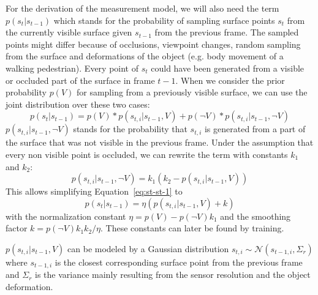 \documentclass[twoside,a4paper,article]{combine}
\begin{document}
For the derivation of the measurement model, we will also need the
term $p(s_t|s_{t-1})$ which stands for the probability of sampling
surface points $s_t$ from the currently visible surface given
$s_{t-1}$ from the previous frame. The sampled points might differ
because of occlusions, viewpoint changes, random sampling from the
surface and deformations of the object (e.g. body movement of a
walking pedestrian). Every point of $s_t$ could have been generated
from a visible or occluded part of the surface in frame $t-1$. When we
consider the prior probability $p(V)$ for sampling from a previously
visible surface, we can use the joint distribution over these two
cases:
\begin{equation}
\label{eq:st-st-1}
p(s_t|s_{t-1})=p(V)*p(s_{t,i}|s_{t-1},V) + p(\neg V)*p(s_{t,i}|s_{t-1},\neg V)
\end{equation}
$p(s_{t,i}|s_{t-1},\neg V)$ stands for the probability that $s_{t,i}$
is generated from a part of the surface that was not visible in the
previous frame. Under the assumption that every non visible point is
occluded, we can rewrite the term with constants $k_1$ and $k_2$:
\begin{equation}
p(s_{t,i}|s_{t-1},\neg V) = k_1 (k_2 - p(s_{t,i}|s_{t-1},V))
\end{equation}
This allows simplifying Equation~\ref{eq:st-st-1} to
\begin{equation}
p(s_t|s_{t-1})=\eta (p(s_{t,i}|s_{t-1},V) + k)
\end{equation}
with the normalization constant $\eta=p(V)-p(\neg V) k_1$ and the
smoothing factor $k=p(\neg V)k_1k_2/\eta$.
These constants can later be found by training.

$p(s_{t,i}|s_{t-1},V)$ can be modeled by a
Gaussian distribution $s_{t,i} \sim \mathcal{N}(s_{t-1,i},\Sigma_r)$ where
$s_{t-1,i}$ is the closest corresponding surface point from the
previous frame and $\Sigma_r$ is the variance mainly resulting from
the sensor resolution and the object deformation.
\end{document}
